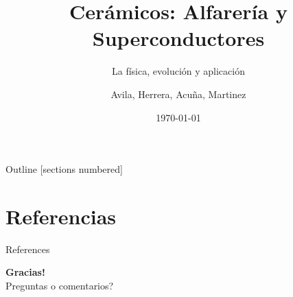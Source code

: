 \documentclass[aspectratio=169,sn-mathphys-num]{beamer}
\title{Cerámicos: Alfarería y Superconductores}
\subtitle{La física, evolución y aplicación}
\author{Avila, Herrera, Acuña, Martinez}
\institute{Universidad Distrital Francisco José de Caldas}
\date{\today}
\begin{document}
\begin{frame}
	\titlepage
\end{frame}

\begin{frame}{Outline}
	[sections numbered]
	\tableofcontents
\end{frame}









\section{Referencias}
\begin{frame}[allowframebreaks]{References}
	\printbibliography
	\nocite{*}
\end{frame}

\begin{frame}[plain]
	\centering
	\vspace{1cm}
	{\Huge \textbf{Gracias!}}\\[1cm]
	{\large Preguntas o comentarios?}
\end{frame}
\end{document}
